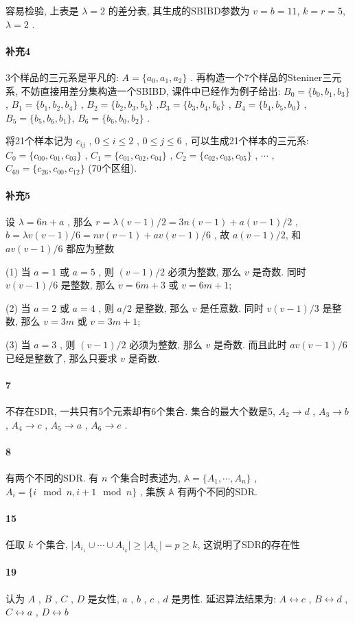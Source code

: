 \documentclass[a4paper, UTF8]{ctexart}				%
\numberwithin{equation}{section}				%
\begin{document}
        容易检验, 上表是 $\lambda = 2$ 的差分表, 其生成的SBIBD参数为 $v=b=11$, $k=r=5$, $\lambda = 2$ .
    \paragraph{补充4}\quad 
        3个样品的三元系是平凡的: $A = \{a_0, a_1, a_2\}$ . 再构造一个7个样品的Steniner三元系, 不妨直接用差分集构造一个SBIBD, 课件中已经作为例子给出:
        $B_0 = \{b_0, b_1, b_3\}$ , $B_1 = \{b_1, b_2, b_4\}$ , $B_2 = \{b_2, b_3, b_5\}$ ,$ B_3 = \{b_3, b_4, b_6\}$ , $B_4 = \{b_4, b_5, b_0\}$ , $B_5 = \{b_5, b_6, b_1\}$, $B_6 = \{b_6, b_0, b_2\}$ .

        将21个样本记为 $c_{ij}$ , $0 \le i \le 2$ ,  $0 \le j \le 6$ , 可以生成21个样本的三元系: 
        $C_0 = \{c_{00}, c_{01}, c_{03}\}$ , $C_1 = \{c_{01}, c_{02}, c_{04}\}$ , $C_2 = \{c_{02}, c_{03}, c_{05}\}$ , $\cdots$ , $C_69 = \{c_{26}, c_{00}, c_{12}\}$ (70个区组).
    \paragraph{补充5}\quad 
        设 $\lambda=6n+a$ , 那么 $r = \lambda(v-1)/2 = 3n(v-1) + a(v-1)/2$ , $b = \lambda v(v-1)/6 = nv(v-1) + av(v-1)/6$ , 故 $a(v-1)/2$, 和 $av(v-1)/6$ 都应为整数
        
        (1) 当 $a=1$ 或 $a=5$ , 则 $(v-1)/2$ 必须为整数, 那么 $v$ 是奇数. 同时 $v(v-1)/6$ 是整数, 那么 $v=6m+3$ 或 $v=6m+1$;

        (2) 当 $a=2$ 或 $a=4$ , 则 $a/2$ 是整数, 那么 $v$ 是任意数. 同时 $v(v-1)/3$ 是整数, 那么 $v=3m$ 或 $v=3m+1$;

        (3) 当 $a=3$ , 则 $(v-1)/2$ 必须为整数, 那么 $v$ 是奇数. 而且此时 $av(v-1)/6$ 已经是整数了, 那么只要求 $v$ 是奇数.

    \paragraph{7}\quad 
        不存在SDR, 一共只有5个元素却有6个集合. 集合的最大个数是5, $A_2 \rightarrow d$ , $A_3 \rightarrow b$ , $A_4 \rightarrow c$ , $A_5 \rightarrow a$ , $A_6 \rightarrow e$ .
    \paragraph{8}\quad 
        有两个不同的SDR. 有 $n$ 个集合时表述为, $\mathbb{A} = \{A_1, \cdots, A_n\}$ , $A_i = \{i \mod n, i+1 \mod n\}$ , 集族 $\mathbb{A}$ 有两个不同的SDR.
    \paragraph{15}\quad 
        任取 $k$ 个集合, $\vert{A_{i_1} \cup \cdots \cup A_{i_k}}\vert \ge \vert{A_{i_1}}\vert = p \ge k$, 这说明了SDR的存在性
    \paragraph{19}\quad 
        认为 $A$ , $B$ , $C$ , $D$ 是女性, $a$ , $b$ , $c$ , $d$ 是男性. 延迟算法结果为: $A \leftrightarrow c$ , $B \leftrightarrow d$ , $C \leftrightarrow a$ , $D \leftrightarrow b$
\end{document}
